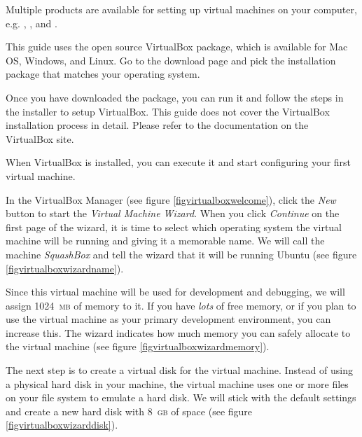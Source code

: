 \documentclass[final,ebook,10pt,twoside,openright]{memoir}
\begin{document}
Multiple products are available for setting up virtual machines on your computer, e.g. , , and .

This guide uses the open source VirtualBox package, which is available for Mac OS, Windows, and Linux. Go to the download page and pick the installation package that matches your operating system.


Once you have downloaded the package, you can run it and follow the steps in the installer to setup VirtualBox. This guide does not cover the VirtualBox installation process in detail. Please refer to the documentation on the VirtualBox site.

When VirtualBox is installed, you can execute it and start configuring your first virtual machine.


In the VirtualBox Manager (see figure \ref{figvirtualboxwelcome}), click the \emph{New} button to start the \emph{Virtual Machine Wizard}. When you click \emph{Continue} on the first page of the wizard, it is time to select which operating system the virtual machine will be running and giving it a memorable name. We will call the machine \emph{SquashBox} and tell the wizard that it will be running Ubuntu (see figure \ref{figvirtualboxwizardname}).


Since this virtual machine will be used for development and debugging, we will assign 1024~\textsc{mb} of memory to it. If you have \emph{lots} of free memory, or if you plan to use the virtual machine as your primary development environment, you can increase this. The wizard indicates how much memory you can safely allocate to the virtual machine (see figure \ref{figvirtualboxwizardmemory}).


The next step is to create a virtual disk for the virtual machine. Instead of using a physical hard disk in your machine, the virtual machine uses one or more files on your file system to emulate a hard disk. We will stick with the default settings and create a new hard disk with 8~\textsc{gb} of space (see figure \ref{figvirtualboxwizarddisk}).
\end{document}
